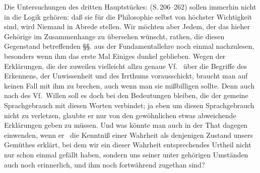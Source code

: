 Die Untersuchungen des dritten Hauptstückes:  (S.\,206--262) sollen immerhin nicht in die Logik gehören: daß sie für die Philosophie selbst von höchster Wichtigkeit sind, wird Niemand in Abrede stellen. Wir möchten aber Jedem, der das hieher Gehörige im Zusammenhange zu übersehen wünscht, rathen, die diesen Gegenstand betreffenden §§. aus der Fundamentallehre noch einmal nachzulesen, besonders wenn ihm das erste Mal Einiges dunkel geblieben. Wegen der Erklärungen, die der zuweilen vielleicht allzu  genaue Vf.\  über die Begriffe des Erkennens, der Unwissenheit und des Irrthums vorausschickt, braucht man auf keinen Fall mit ihm zu brechen, auch wenn man sie mißbilligen sollte. Denn auch nach des Vf.\ Willen soll es doch bei den Bedeutungen bleiben, die der gemeine Sprachgebrauch mit diesen Worten verbindet; ja eben um diesen Sprachgebrauch nicht zu verletzen, glaubte er nur von den gewöhnlichen etwas abweichende Erklärungen geben zu müssen. Und was könnte man auch in der That dagegen einwenden, wenn er \zB\ die Kenntniß einer Wahrheit als denjenigen Zustand unsers Gemüthes erklärt, bei dem wir ein dieser Wahrheit entsprechendes Urtheil nicht nur schon einmal gefällt haben, sondern uns seiner unter gehörigen Umständen auch noch erinnerlich, und ihm noch fortwährend zugethan sind? \par 
